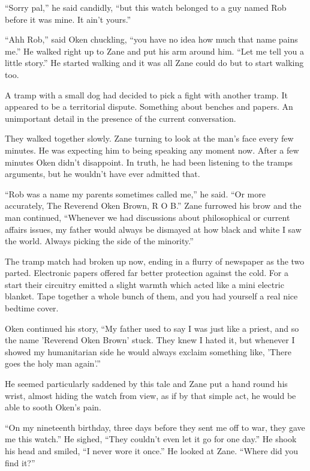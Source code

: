 ``Sorry pal,'' he said candidly, ``but this watch belonged to a guy named Rob before it was mine.  It ain't yours.''

``Ahh Rob,'' said Oken chuckling, ``you have no idea how much that name pains me.''  He walked right up to Zane and put his arm around him.  ``Let me tell you a little story.''  He started walking and it was all Zane could do but to start walking too.

A tramp with a small dog had decided to pick a fight with another tramp.  It appeared to be a territorial dispute.  Something about benches and papers.  An unimportant detail in the presence of the current conversation.

They walked together slowly.  Zane turning to look at the man's face every few minutes.  He was expecting him to being speaking any moment now.  After a few minutes Oken didn't disappoint.  In truth, he had been listening to the tramps arguments, but he wouldn't have ever admitted that.

``Rob was a name my parents sometimes called me,'' he said.  ``Or more accurately, The Reverend Oken Brown, R O B.''  Zane furrowed his brow and the man continued, ``Whenever we had discussions about philosophical or current affairs issues, my father would always be dismayed at how black and white I saw the world.  Always picking the side of the minority.''

The tramp match had broken up now, ending in a flurry of newspaper as the two parted.  Electronic papers offered far better protection against the cold.  For a start their circuitry emitted a slight warmth which acted like a mini electric blanket.  Tape together a whole bunch of them, and you had yourself a real nice bedtime cover.

Oken continued his story, ``My father used to say I was just like a priest, and so the name 'Reverend Oken Brown' stuck.  They knew I hated it, but whenever I showed my humanitarian side he would always exclaim something like, 'There goes the holy man again'.''

He seemed particularly saddened by this tale and Zane put a hand round his wrist, almost hiding the watch from view, as if by that simple act, he would be able to sooth Oken's pain.

``On my nineteenth birthday, three days before they sent me off to war, they gave me this watch.''  He sighed, ``They couldn't even let it go for one day.''  He shook his head and smiled, ``I never wore it once.''  He looked at Zane.  ``Where did you find it?''

